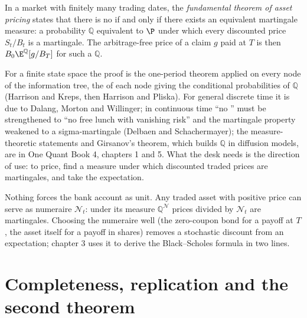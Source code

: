 \begin{theorem}\label{thm:dv:no-arbitrage-and-the-fundamental-theorems:ftap}
In a market with finitely many trading dates, the \emph{fundamental theorem of
asset pricing} states that there is
no  if and only if there exists an equivalent martingale measure: a
probability $\mathbb Q$ equivalent to $\P$ under which every discounted price
$S_t/B_t$ is a martingale. The arbitrage-free price of a claim $g$ paid at $T$
is then $B_0\E^{\mathbb Q}[g/B_T]$ for such a $\mathbb Q$.
\end{theorem}
\admitted

For a finite state space the proof is the one-period theorem applied on every
node of the information tree, the  of each node giving the
conditional probabilities of $\mathbb Q$ (Harrison and Kreps, then Harrison and
Pliska). For general discrete time it is due to Dalang, Morton and Willinger;
in continuous time ``no '' must be strengthened to ``no free lunch
with vanishing risk'' and the martingale property weakened to a sigma-martingale
(Delbaen and Schachermayer); the measure-theoretic statements and Girsanov's
theorem, which builds $\mathbb Q$ in diffusion models, are in One Quant Book 4,
chapters 1 and 5. What the desk needs is the direction of use: to price, find
a measure under which discounted traded prices are martingales, and take the
expectation.

\begin{remark}\label{rem:dv:no-arbitrage-and-the-fundamental-theorems:numeraire}
Nothing forces the bank account as unit. Any traded asset with positive price
can serve as numeraire $\mathcal N_t$: under its measure $\mathbb Q^{\mathcal N}$
prices divided by $\mathcal N_t$ are martingales. Choosing the numeraire well
(the zero-coupon bond for a payoff at $T$, the asset itself for a payoff in
shares) removes a stochastic discount from an expectation; chapter 3 uses it to
derive the Black--Scholes formula in two lines.
\end{remark}

\section{Completeness, replication and the second theorem}

